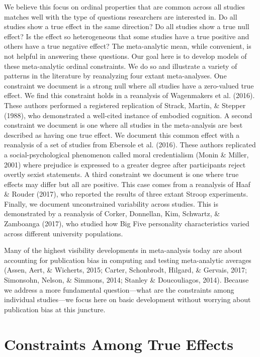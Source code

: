 \documentclass[english,man]{apa6}
\newcounter{author}
\theoremstyle{definition}
\theoremstyle{definition}
\theoremstyle{remark}
\begin{document}
We believe this focus on ordinal properties that are common across all
studies matches well with the type of questions researchers are
interested in. Do all studies show a true effect in the same direction?
Do all studies show a true null effect? Is the effect so heterogeneous
that some studies have a true positive and others have a true negative
effect? The meta-analytic mean, while convenient, is not helpful in
answering these questions. Our goal here is to develop models of these
meta-analytic ordinal constraints. We do so and illustrate a variety of
patterns in the literature by reanalyzing four extant meta-analyses. One
constraint we document is a strong null where all studies have a
zero-valued true effect. We find this constraint holds in a reanalysis
of Wagenmakers et al. (2016). These authors performed a registered
replication of Strack, Martin, \& Stepper (1988), who demonstrated a
well-cited instance of embodied cognition. A second constraint we
document is one where all studies in the meta-analysis are best
described as having one true effect. We document this common effect with
a reanalysis of a set of studies from Ebersole et al. (2016). These
authors replicated a social-psychological phenomenon called moral
credentialism (Monin \& Miller, 2001) where prejudice is expressed to a
greater degree after participants reject overtly sexist statements. A
third constraint we document is one where true effects may differ but
all are positive. This case comes from a reanalysis of Haaf \& Rouder
(2017), who reported the results of three extant Stroop experiments.
Finally, we document unconstrained variability across studies. This is
demonstrated by a reanalysis of Corker, Donnellan, Kim, Schwartz, \&
Zamboanga (2017), who studied how Big Five personality characteristics
varied across different university populations.

Many of the highest visibility developments in meta-analysis today are
about accounting for publication bias in computing and testing
meta-analytic averages (Assen, Aert, \& Wicherts, 2015; Carter,
Schonbrodt, Hilgard, \& Gervais, 2017; Simonsohn, Nelson, \& Simmons,
2014; Stanley \& Doucouliagos, 2014). Because we address a more
fundamental question---what are the constraints among individual
studies---we focus here on basic development without worrying about
publication bias at this juncture.

\section{Constraints Among True
Effects}\label{constraints-among-true-effects}
\end{document}
